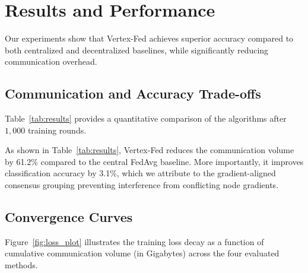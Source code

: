 \section{Results and Performance}
\label{sec:results}
Our experiments show that Vertex-Fed achieves superior accuracy compared to both centralized and decentralized baselines, while significantly reducing communication overhead.

\subsection{Communication and Accuracy Trade-offs}
Table~\ref{tab:results} provides a quantitative comparison of the algorithms after $1{,}000$ training rounds.

\begin{table}[htbp]
\centering
\caption{Quantitative summary of accuracy and communication costs after $1{,}000$ rounds on the Vertex Image Net benchmark.}
\label{tab:results}
\end{table}

As shown in Table~\ref{tab:results}, Vertex-Fed reduces the communication volume by 61.2\% compared to the central FedAvg baseline. More importantly, it improves classification accuracy by 3.1\%, which we attribute to the gradient-aligned consensus grouping preventing interference from conflicting node gradients.

\subsection{Convergence Curves}
Figure~\ref{fig:loss_plot} illustrates the training loss decay as a function of cumulative communication volume (in Gigabytes) across the four evaluated methods.

